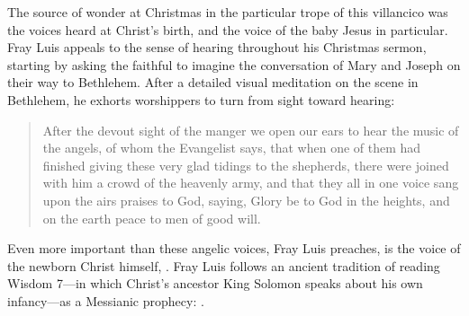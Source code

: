 The source of wonder at Christmas in the particular trope of this villancico was
the voices heard at Christ's birth, and the voice of the baby Jesus in
particular.
Fray Luis appeals to the sense of hearing throughout his Christmas sermon,
starting by asking the faithful to imagine the conversation of Mary and Joseph
on their way to Bethlehem.
After a detailed visual meditation on the scene in Bethlehem, he exhorts
worshippers to turn from sight toward hearing:
\begin{quote}
    After the devout sight of the manger we open our ears to hear the music of
    the angels, of whom the Evangelist says, that when one of them had finished
    giving these very glad tidings to the shepherds, there were joined with him
    a crowd of the heavenly army, and that they all in one voice sang upon the
    airs praises to God, saying, Glory be to God in the heights, and on the
    earth peace to men of good will.%
        \Autocite
        [40: .]
        {LuisdeGranada:Xmas}
\end{quote}
Even more important than these angelic voices, Fray Luis preaches, is the voice
of the newborn Christ himself, .
Fray Luis follows an ancient tradition of reading Wisdom 7---in which Christ's
ancestor King Solomon speaks about his own infancy---as a Messianic prophecy:
.%
    \Autocites
    [37--38: ]
    {LuisdeGranada:Xmas}
    [Cf.] [670, on Lk 2:7.]
    {Lapide:Gospels19C}

